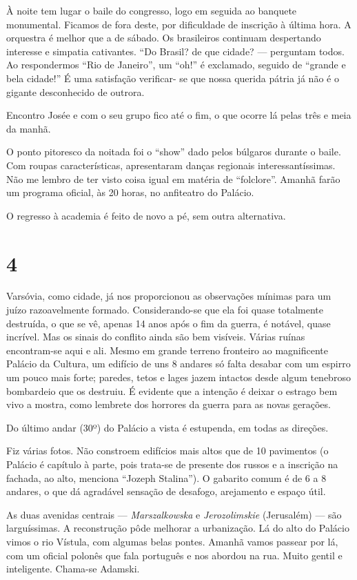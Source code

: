 À noite tem lugar o baile do congresso, logo em seguida ao banquete monumental. Ficamos de fora deste, por dificuldade de inscrição à última hora. A orquestra é melhor que a de sábado. Os brasileiros continuam despertando interesse e simpatia cativantes. ``Do Brasil? de que cidade? --- perguntam todos. Ao respondermos ``Rio de Janeiro'', um ``oh!'' é exclamado, seguido de ``grande e bela cidade!'' É uma satisfação verificar- se que nossa querida pátria já não é o gigante desconhecido de outrora.

Encontro Josée e com o seu grupo fico até o fim, o que ocorre lá pelas três e meia da manhã.

O ponto pitoresco da noitada foi o ``show'' dado pelos búlgaros durante o baile. Com roupas características, apresentaram danças regionais interessantíssimas. Não me lembro de ter visto coisa igual em matéria de ``folclore''. Amanhã farão um programa oficial, às 20 horas, no anfiteatro do Palácio.

O regresso à academia é feito de novo a pé, sem outra alternativa.

\section*{4 \adfflatleafright {}}
Varsóvia, como cidade, já nos proporcionou as observações mínimas para um juízo razoavelmente formado. Considerando-se que ela foi quase totalmente destruída, o que se vê, apenas 14 anos após o fim da guerra, é notável, quase incrível. Mas os sinais do conflito ainda são bem visíveis. Várias ruínas encontram-se aqui e ali. Mesmo em grande terreno fronteiro ao magnificente Palácio da Cultura, um edifício de uns 8 andares só falta desabar com um espirro um pouco mais forte; paredes, tetos e lages jazem intactos desde algum tenebroso bombardeio que os destruiu. É evidente que a intenção é deixar o estrago bem vivo a mostra, como lembrete dos horrores da guerra para as novas gerações.

Do último andar (30º) do Palácio a vista é estupenda, em todas as direções.

Fiz várias fotos. Não constroem edifícios mais altos que de 10 pavimentos (o Palácio é capítulo à parte, pois trata-se de presente dos russos e a inscrição na fachada, ao alto, menciona ``Jozeph Stalina''). O gabarito comum é de 6 a 8 andares, o que dá agradável sensação de desafogo, arejamento e espaço útil.

As duas avenidas centrais --- \textit{Marszalkowska} e \textit{Jerozolimskie} (Jerusalém) --- são larguíssimas. A reconstrução pôde melhorar a urbanização. Lá do alto do Palácio vimos o rio Vístula, com algumas belas pontes. Amanhã vamos passear por lá, com um oficial polonês que fala português e nos abordou na rua. Muito gentil e inteligente. Chama-se Adamski.

